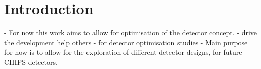\chapter{Introduction} %
\label{chap:introduction} %

\begin{comment} %
Tell them what you are going to tell them
\end{comment}

- For now this work aims to allow for optimisation of the \chips detector concept.
- drive the development help others
- for detector optimisation studies
- Main purpose for now is to allow for the exploration of different detector designs, for future
CHIPS detectors.